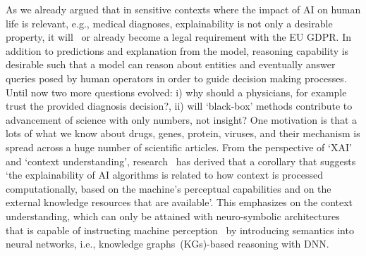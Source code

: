 \hspace*{3.5mm} As we already argued that in sensitive contexts where the impact of AI on human life is relevant, e.g., medical diagnoses, explainability is not only a desirable property, it will~\cite{futia2020integration} or already become a legal requirement with the EU GDPR. In addition to predictions and explanation from the model, reasoning capability is desirable such that a model can reason about entities and eventually answer queries posed by human operators in order to guide decision making processes. Until now two more questions evolved: i) why should a physicians, for example trust the provided diagnosis decision?, ii) will `black-box' methods contribute to advancement of science with only numbers, not insight? One motivation is that a lots of what we know about drugs, genes, protein, viruses, and their mechanism is spread across a huge number of scientific articles. From the perspective of `XAI' and `context understanding', research~\cite{oltramari2020neuro} has derived that a corollary that suggests `the explainability of AI algorithms is related to how context is processed computationally, based on the machine's perceptual capabilities and on the external knowledge resources that are available'. This emphasizes on the context understanding, which can only be attained with neuro-symbolic architectures that is capable of instructing machine perception~\cite{oltramari2020neuro} by introducing semantics into neural networks, i.e., knowledge graphs~(KGs)-based reasoning with DNN.

